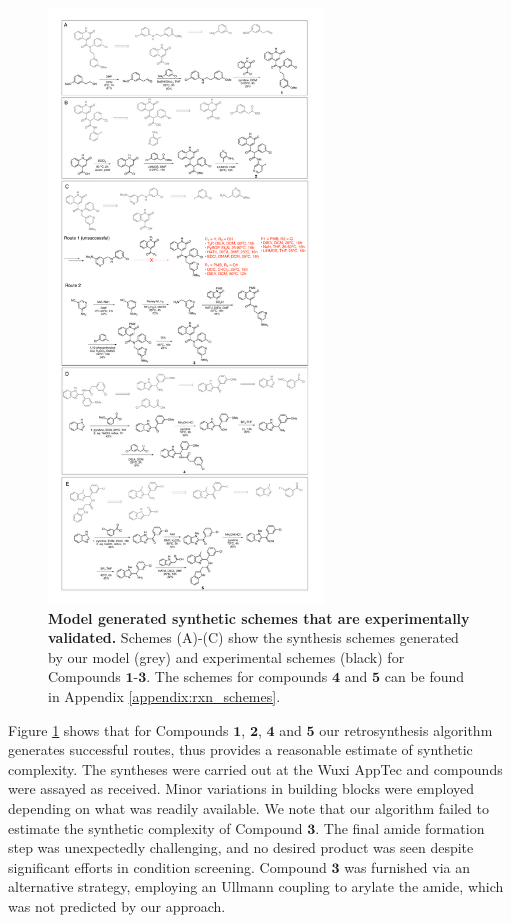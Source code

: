 \begin{figure}[!th]
    \centering
        \includegraphics[width=0.65\textwidth]{Chapters/Ranking/Figs/rxn_schemes_1_to_3.pdf}
        \caption{\textbf{Model generated synthetic schemes that are experimentally validated.} Schemes (A)-(C) show the synthesis schemes generated by our model (grey) and experimental schemes (black) for Compounds $\mathbf{1}$-$\mathbf{3}$. The schemes for compounds $\mathbf{4}$ and $\mathbf{5}$ can be found in Appendix \ref{appendix:rxn_schemes}.}
        \label{fig:synthesis_schemes}
    \end{figure}

Figure \ref{fig:synthesis_schemes} shows that for Compounds $\mathbf{1}$, $\mathbf{2}$, $\mathbf{4}$ and $\mathbf{5}$ our retrosynthesis algorithm generates successful routes, thus provides a reasonable estimate of synthetic complexity. The syntheses were carried out at the Wuxi AppTec and compounds were assayed as received. Minor variations in building blocks were employed depending on what was readily available. We note that our algorithm failed to estimate the synthetic complexity of Compound $\mathbf{3}$. The final amide formation step was unexpectedly challenging, and no desired product was seen despite significant efforts in condition screening. Compound $\mathbf{3}$ was furnished via an alternative strategy, employing an Ullmann coupling to arylate the amide, which was not predicted by our approach. 


